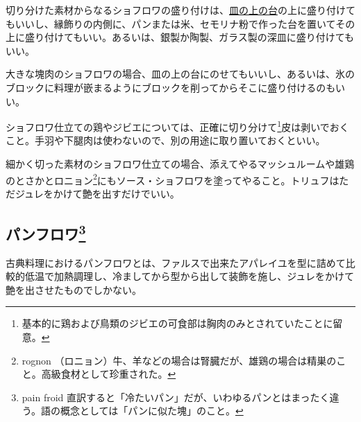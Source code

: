 切り分けた素材からなるショフロワの盛り付けは、\protect\hyperlink{fonds-de-plats}{皿の上の台}の上に盛り付けてもいいし、縁飾りの内側に、パンまたは米、セモリナ粉で作った台を置いてその上に盛り付けてもいい。あるいは、銀製か陶製、ガラス製の深皿に盛り付けてもいい。

大きな塊肉のショフロワの場合、皿の上の台にのせてもいいし、あるいは、氷のブロックに料理が嵌まるようにブロックを削ってからそこに盛り付けるのもいい。

ショフロワ仕立ての鶏やジビエについては、正確に切り分けて\footnote{基本的に鶏および鳥類のジビエの可食部は胸肉のみとされていたことに留意。}皮は剥いでおくこと。手羽や下腿肉は使わないので、別の用途に取り置いておくといい。

細かく切った素材のショフロワ仕立ての場合、添えてやるマッシュルームや雄鶏のとさかとロニョン\footnote{rognon
  （ロニョン）牛、羊などの場合は腎臓だが、雄鶏の場合は精巣のこと。高級食材として珍重された。}にもソース・ショフロワを塗ってやること。トリュフはただジュレをかけて艶を出すだけでいい。

\hypertarget{pains-froids}{%
\subsection[パンフロワ]{\texorpdfstring{パンフロワ\footnote{pain froid
  直訳すると「冷たいパン」だが、いわゆるパンとはまったく違う。語の概念としては「パンに似た塊」のこと。}}{パンフロワ}}\label{pains-froids}}



古典料理におけるパンフロワとは、ファルスで出来たアパレイユを型に詰めて比較的低温で加熱調理し、冷ましてから型から出して装飾を施し、ジュレをかけて艶を出させたものでしかない。

